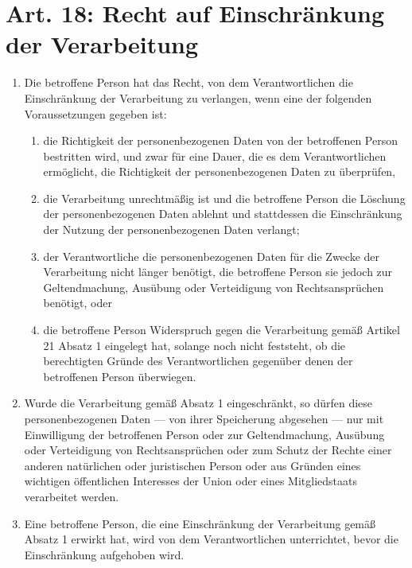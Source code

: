 \documentclass[A4, 12pt]{scrbook}
\begin{document}
    \section{Art. 18: Recht auf Einschränkung der Verarbeitung}
        \begin{enumerate}[label=(\arabic*)]
            \item Die betroffene Person hat das Recht, von dem Verantwortlichen die Einschränkung der Verarbeitung zu verlangen, wenn eine der folgenden Voraussetzungen gegeben ist:
                \begin{enumerate}[label=\alph*)]
                    \item die Richtigkeit der personenbezogenen Daten von der betroffenen Person bestritten wird, und zwar für eine Dauer, die es dem Verantwortlichen ermöglicht, die Richtigkeit der personenbezogenen Daten zu überprüfen,
                    \item die Verarbeitung unrechtmäßig ist und die betroffene Person die Löschung der personenbezogenen Daten ablehnt und stattdessen die Einschränkung der Nutzung der personenbezogenen Daten verlangt; 
                    \item der Verantwortliche die personenbezogenen Daten für die Zwecke der Verarbeitung nicht länger benötigt, die betroffene Person sie jedoch zur Geltendmachung, Ausübung oder Verteidigung von Rechtsansprüchen benötigt, oder
                    \item die betroffene Person Widerspruch gegen die Verarbeitung gemäß Artikel 21 Absatz 1 eingelegt hat, solange noch nicht feststeht, ob die berechtigten Gründe des Verantwortlichen gegenüber denen der betroffenen Person überwiegen.
                \end{enumerate}
            \item Wurde die Verarbeitung gemäß Absatz 1 eingeschränkt, so dürfen diese personenbezogenen Daten — von ihrer Speicherung abgesehen — nur mit Einwilligung der betroffenen Person oder zur Geltendmachung, Ausübung oder Verteidigung von Rechtsansprüchen oder zum Schutz der Rechte einer anderen natürlichen oder juristischen Person oder aus Gründen eines wichtigen öffentlichen Interesses der Union oder eines Mitgliedstaats verarbeitet werden.
            \item Eine betroffene Person, die eine Einschränkung der Verarbeitung gemäß Absatz 1 erwirkt hat, wird von dem Verantwortlichen unterrichtet, bevor die Einschränkung aufgehoben wird. 
        \end{enumerate}
\end{document}
